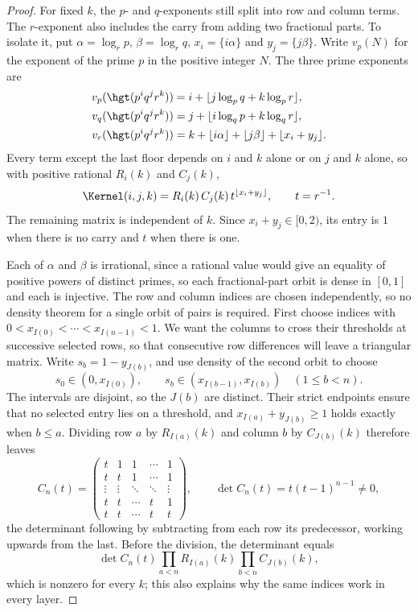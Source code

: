 \begin{proof}
For fixed $k$, the $p$- and $q$-exponents still split into row and column
terms. The $r$-exponent also includes the carry from adding two fractional
parts. To isolate it, put $\alpha=\log_r p$, $\beta=\log_r q$,
$x_i=\{i\alpha\}$ and $y_j=\{j\beta\}$. Write $v_p(N)$ for the exponent
of the prime $p$ in the positive integer $N$. The three prime exponents are
\[
 \begin{split}
 v_p(\hgt(p^iq^jr^k))&=i+\lfloor j\log_pq+k\log_pr\rfloor,\\
 v_q(\hgt(p^iq^jr^k))&=j+\lfloor i\log_qp+k\log_qr\rfloor,\\
 v_r(\hgt(p^iq^jr^k))&=k+\lfloor i\alpha\rfloor+\lfloor j\beta\rfloor+
   \lfloor x_i+y_j\rfloor .
 \end{split}
\]
Every term except the last floor depends on $i$ and $k$ alone or on $j$ and $k$
alone, so with positive rational $R_i(k)$ and $C_j(k)$,
\begin{equation}\label{long269:eq:carry-factorisation}
 \Kernel(i,j,k)=R_i(k)\,C_j(k)\,t^{\lfloor x_i+y_j\rfloor},
 \qquad t=r^{-1} .
\end{equation}
The remaining matrix is independent of $k$. Since $x_i+y_j\in[0,2)$,
its entry is $1$ when there is no carry and $t$ when there is one.

Each of $\alpha$ and $\beta$ is irrational, since a rational value would give
an equality of positive powers of distinct primes, so each fractional-part
orbit is dense in $[0,1]$ and each is injective.  The row and column indices
are chosen independently, so no density theorem for a single orbit of
pairs is required.  First choose indices with
$0<x_{I(0)}<\cdots<x_{I(n-1)}<1$.  We want the columns to cross their
thresholds at successive selected rows, so that consecutive row differences
will leave a triangular matrix.  Write $s_b=1-y_{J(b)}$, and use density
of the second orbit to choose
\[
 s_0\in(0,x_{I(0)}),\qquad
 s_b\in(x_{I(b-1)},x_{I(b)})\quad(1\le b<n).
\]
The intervals are disjoint, so the $J(b)$ are distinct.  Their strict
endpoints ensure that no selected entry lies on a threshold, and
$x_{I(a)}+y_{J(b)}\ge1$ holds exactly when $b\le a$.  Dividing row $a$ by
$R_{I(a)}(k)$ and column $b$ by $C_{J(b)}(k)$ therefore leaves
\[
 C_n(t)=\begin{pmatrix}
 t&1&1&\cdots&1\\
 t&t&1&\cdots&1\\
 \vdots&\vdots&\ddots&\ddots&\vdots\\
 t&t&\cdots&t&1\\
 t&t&\cdots&t&t
 \end{pmatrix},
 \qquad
 \det C_n(t)=t(t-1)^{n-1}\ne0 ,
\]
the determinant following by subtracting from each row its predecessor, working
upwards from the last.  Before the division, the determinant equals
\[
 \det C_n(t)\prod_{a<n}R_{I(a)}(k)\prod_{b<n}C_{J(b)}(k),
\]
which is nonzero for every $k$; this also explains why the same indices work
in every layer.


\end{proof}
